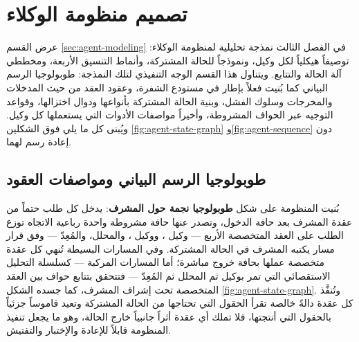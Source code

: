 %
%
%
%
\section{تصميم منظومة الوكلاء}
\label{sec:agents-design}

عرض القسم \ref{sec:agent-modeling} في الفصل الثالث نمذجة تحليلية لمنظومة الوكلاء: توصيفاً هيكلياً لكل وكيل، ونموذجاً للحالة المشتركة، وأنماط التنسيق الأربعة، ومخططي آلة الحالة والتتابع. ويتناول هذا القسم الوجه التنفيذي لتلك النمذجة: طوبولوجيا الرسم البياني كما بُنيت فعلاً بإطار  في مستودع الشفرة، وعقود العقد من حيث المدخلات والمخرجات وسلوك الفشل، وبنية الحالة المشتركة بأنواعها ودوال اختزالها، وقواعد التوجيه عبر الحواف المشروطة، وأخيراً مواصفات الأدوات التي يستعملها كل وكيل. ويُبنى كل ما يلي فوق الشكلين \ref{fig:agent-state-graph} و\ref{fig:agent-sequence} دون إعادة رسم لهما.

\subsection{طوبولوجيا الرسم البياني ومواصفات العقود}
\label{subsec:agents-topology}

بُنيت المنظومة على شكل \textbf{طوبولوجيا نجمة حول المشرف}: يدخل كل طلب حتماً من عقدة المشرف  بعد حافة الدخول، وتصدر عنها حافة مشروطة واحدة رباعية الاتجاه توزع الطلب على العقد المتخصصة الأربع — وكيل ، ووكيل ، والمحلل، والمُعِدّ — وفق قرار مسار يكتبه المشرف في الحالة المشتركة. وفي المسارات البسيطة تُنهي كل عقدة متخصصة عملها بحافة خروج مباشرة؛ أما المسارات المركبة — كسلسلة التحليل الاستقصائي التي تمر بوكيل  ثم المحلل ثم المُعِدّ — فتتحقق بتتابع حواف بين العقد المتخصصة تحت إشراف المشرف، كما جسده الشكل \ref{fig:agent-state-graph}. وتُنفَّذ كل عقدة دالةً خالصة تقرأ الحقول التي تحتاجها من الحالة المشتركة وتعيد قاموساً جزئياً بالحقول التي أنتجتها، فلا تملك أي عقدة أثراً جانبياً خارج الحالة، وهو ما يجعل تنفيذ المنظومة قابلاً للإعادة والإختبار والتفتيش.

